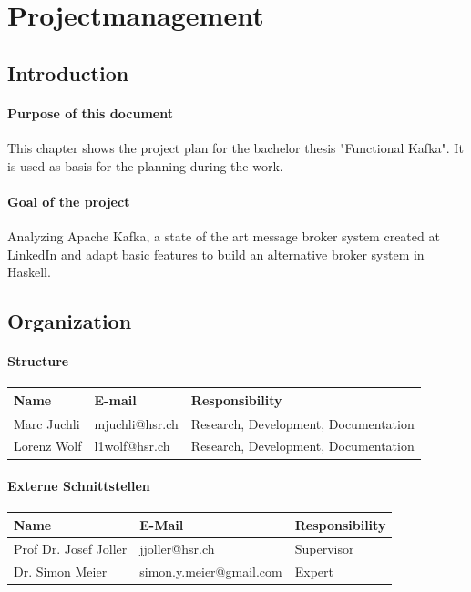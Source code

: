 \chapter{Projectmanagement}

\section{Introduction}

\subsubsection*{Purpose of this document}
This chapter shows the project plan for the bachelor thesis "Functional Kafka".
It is used as basis for the planning during the work. 

\subsubsection*{Goal of the project}
Analyzing Apache Kafka, a state of the art message broker system created at
LinkedIn and adapt basic features to build an alternative broker system in
Haskell. 

\section{Organization}

\subsubsection*{Structure}

\begin{tabular}[t]{|l|l|l|} \hline
\textbf{Name} & \textbf{E-mail} & \textbf{Responsibility} \\ \hline
Marc Juchli & mjuchli@hsr.ch & Research, Development, Documentation \\ \hline
Lorenz Wolf & l1wolf@hsr.ch & Research, Development, Documentation \\ \hline 
\end{tabular}

\subsubsection*{Externe Schnittstellen}

\begin{tabular}[t]{|l|l|l|} \hline
\textbf{Name} & \textbf{E-Mail} & \textbf{Responsibility}  \\ \hline
Prof Dr. Josef Joller & jjoller@hsr.ch & Supervisor \\ \hline 
Dr. Simon Meier & simon.y.meier@gmail.com & Expert  \\ \hline\end{tabular}

